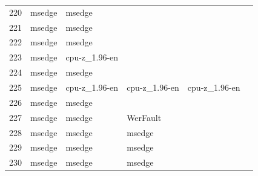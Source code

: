 \documentclass[a4paper,twoside,12pt]{book}
\begin{document}
\begin{appendices}
\begin{table}
\begin{tabular}{l|l|l|l|l|l}
		220 &  msedge &         msedge &                &                &                \\
		221 &  msedge &         msedge &                &                &                \\
		222 &  msedge &         msedge &                &                &                \\
		223 &  msedge &  cpu-z\_1.96-en &                &                &                \\
		224 &  msedge &         msedge &                &                &                \\
		225 &  msedge &  cpu-z\_1.96-en &  cpu-z\_1.96-en &  cpu-z\_1.96-en &                \\
		226 &  msedge &         msedge &                &                &                \\
		227 &  msedge &         msedge &       WerFault &                &                \\
		228 &  msedge &         msedge &         msedge &                &                \\
		229 &  msedge &         msedge &         msedge &                &                \\
		230 &  msedge &         msedge &         msedge &                &                \\
		\bottomrule
	\end{tabular}		
\end{table}


\end{appendices}
\end{document}
